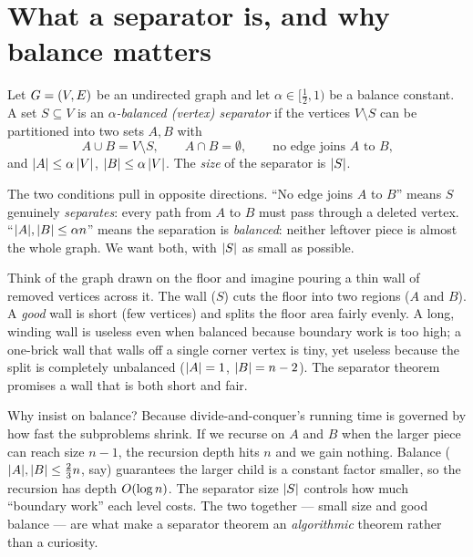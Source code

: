 \chapterline

\section{What a separator is, and why balance matters}

\begin{definition}\label{ch27:def-sep}
Let $G=(V,E)$ be an undirected graph and let $\alpha\in[\tfrac12,1)$ be a balance constant. A set $S\subseteq V$ is an \emph{$\alpha$-balanced (vertex) separator} if the vertices $V\setminus S$ can be partitioned into two sets $A,B$ with
\[
  A\cup B = V\setminus S,\qquad A\cap B=\emptyset,\qquad \text{no edge joins $A$ to $B$,}
\]
and $\lvert A\rvert\le \alpha\,\lvert V\rvert$, $\lvert B\rvert\le \alpha\,\lvert V\rvert$. The \emph{size} of the separator is $\lvert S\rvert$.
\end{definition}

The two conditions pull in opposite directions. ``No edge joins $A$ to $B$'' means $S$ genuinely \emph{separates}: every path from $A$ to $B$ must pass through a deleted vertex. ``$\lvert A\rvert,\lvert B\rvert\le\alpha n$'' means the separation is \emph{balanced}: neither leftover piece is almost the whole graph. We want both, with $\lvert S\rvert$ as small as possible.

\begin{intuitionbox}
Think of the graph drawn on the floor and imagine pouring a thin wall of removed vertices across it. The wall ($S$) cuts the floor into two regions ($A$ and $B$). A \emph{good} wall is short (few vertices) and splits the floor area fairly evenly. A long, winding wall is useless even when balanced because boundary work is too high; a one-brick wall that walls off a single corner vertex is tiny, yet useless because the split is completely unbalanced ($\lvert A\rvert = 1$, $\lvert B\rvert = n-2$). The separator theorem promises a wall that is both short and fair.
\end{intuitionbox}

Why insist on balance? Because divide-and-conquer's running time is governed by how fast the subproblems shrink. If we recurse on $A$ and $B$ when the larger piece can reach size $n-1$, the recursion depth hits $n$ and we gain nothing. Balance ($\lvert A\rvert,\lvert B\rvert\le \tfrac23 n$, say) guarantees the larger child is a constant factor smaller, so the recursion has depth $O(\log n)$. The separator size $\lvert S\rvert$ controls how much ``boundary work'' each level costs. The two together --- small size and good balance --- are what make a separator theorem an \emph{algorithmic} theorem rather than a curiosity.

